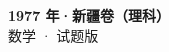 \documentclass[zihao=-4, a4paper]{ctexart}
\begin{document}
\begin{center}
  {\Large\bfseries 1977 年·新疆卷（理科）}\\[4pt]
  {\large 数学 · 试题版}
\end{center}
\medskip
{}

\end{document}
